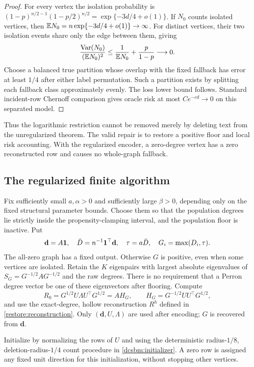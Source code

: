 \begin{proof}
For every vertex the isolation probability is
$(1-p)^{n/2-1}(1-p/2)^{n/2}
=\exp\{-3d/4+o(1)\}$. If $N_0$ counts isolated vertices, then
$\mathbb E N_0=n\exp\{-3d/4+o(1)\}\to\infty$. For distinct vertices,
their two isolation events share only the edge between them, giving
\[
 \frac{\operatorname{Var}(N_0)}{(\mathbb E N_0)^2}
 \le \frac1{\mathbb E N_0}+\frac p{1-p}\longrightarrow0.
\]
Choose a balanced true partition whose overlap with the fixed fallback
has error at least $1/4$ after either label permutation. Such a partition
exists by splitting each fallback class approximately evenly. The loss
lower bound follows. Standard incident-row Chernoff comparison gives
oracle risk at most $Ce^{-cd}\to0$ on this separated model.
\end{proof}

Thus the logarithmic restriction cannot be removed merely by deleting
text from the unregularized theorem. The valid repair is to restore a
positive floor and local risk accounting. With the regularized encoder,
a zero-degree vertex has a zero reconstructed row and causes no
whole-graph fallback.

\subsection{The regularized finite algorithm}
\label{restore:algorithm}

Fix sufficiently small $a,\alpha>0$ and sufficiently large $\beta>0$,
depending only on the fixed structural parameter bounds. Choose them so
that the population degrees lie strictly inside the propensity-clamping
interval, and the population floor is inactive. Put
\[
 \mathbf d=A\mathbf 1,\quad \bar D=n^{-1}\mathbf 1^\top\mathbf d,\quad
 \tau=a\bar D,\quad G_i=\max(D_i,\tau).
\]
The all-zero graph has a fixed output. Otherwise $G$ is positive, even
when some vertices are isolated. Retain the $K$ eigenpairs with largest
absolute eigenvalues of $S_G=G^{-1/2}AG^{-1/2}$ and the raw degrees.
There is no requirement that a Perron degree vector be one of these
eigenvectors after flooring. Compute
\[
 R_0=G^{1/2}U\Lambda U^\top G^{1/2}=AH_G,
 \qquad H_G=G^{-1/2}UU^\top G^{1/2},
\]
and use the exact-degree, hollow reconstruction $R^h$ defined in
\eqref{restore:reconstruction}. Only $(\mathbf d,U,\Lambda)$ are used
after encoding; $G$ is recovered from $\mathbf d$.

Initialize by normalizing the rows of $U$ and using the deterministic
radius-$1/8$, deletion-radius-$1/4$ count procedure in
\cref{dcsbm:initializer}. A zero row is assigned any fixed unit direction
for this initialization, without stopping other vertices.

